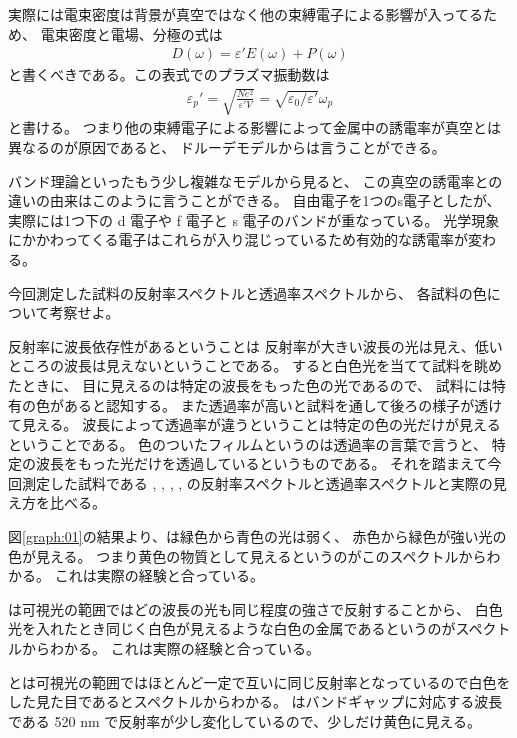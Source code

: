 \documentclass[11pt,dvipdfmx,a4paper]{jsarticle}
\begin{document}
実際には電束密度は背景が真空ではなく他の束縛電子による影響が入ってるため、
電束密度と電場、分極の式は
\begin{align}
    D(\omega) = \varepsilon' E(\omega) +P(\omega)
\end{align}
と書くべきである。この表式でのプラズマ振動数は
\begin{align}
    \varepsilon_p' = \sqrt{\frac{Ne^2}{\varepsilon'V}}=\sqrt{\varepsilon_0/\varepsilon'}\omega_p
\end{align}
と書ける。
つまり他の束縛電子による影響によって金属中の誘電率が真空とは異なるのが原因であると、
ドルーデモデルからは言うことができる。

バンド理論といったもう少し複雑なモデルから見ると、
この真空の誘電率との違いの由来はこのように言うことができる。%
自由電子を1つのs電子としたが、実際には1つ下の d 電子や f 電子と s 電子のバンドが重なっている。
光学現象にかかわってくる電子はこれらが入り混じっているため有効的な誘電率が変わる。
\\

\begin{tcolorbox}[title = 課題3]
    今回測定した試料の反射率スペクトルと透過率スペクトルから、
    各試料の色について考察せよ。
\end{tcolorbox}

反射率に波長依存性があるということは
反射率が大きい波長の光は見え、低いところの波長は見えないということである。
すると白色光を当てて試料を眺めたときに、
目に見えるのは特定の波長をもった色の光であるので、
試料には特有の色があると認知する。
また透過率が高いと試料を通して後ろの様子が透けて見える。
波長によって透過率が違うということは特定の色の光だけが見えるということである。
色のついたフィルムというのは透過率の言葉で言うと、
特定の波長をもった光だけを透過しているというものである。
それを踏まえて今回測定した試料である , , , , 
の反射率スペクトルと透過率スペクトルと実際の見え方を比べる。

図\ref{graph:01}の結果より、は緑色から青色の光は弱く、
赤色から緑色が強い光の色が見える。
つまり黄色の物質として見えるというのがこのスペクトルからわかる。
これは実際の経験と合っている。

は可視光の範囲ではどの波長の光も同じ程度の強さで反射することから、
白色光を入れたとき同じく白色が見えるような白色の金属であるというのがスペクトルからわかる。
これは実際の経験と合っている。

とは可視光の範囲ではほとんど一定で互いに同じ反射率となっているので白色をした見た目であるとスペクトルからわかる。
 はバンドギャップに対応する波長である 520 nm で反射率が少し変化しているので、少しだけ黄色に見える。
\end{document}
